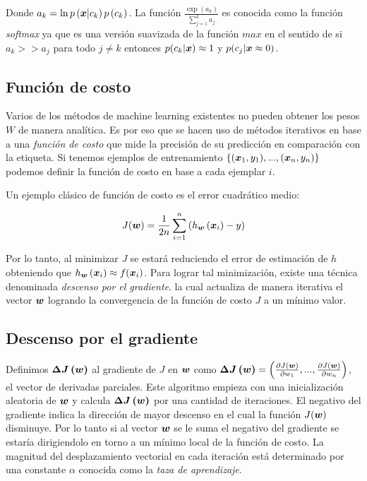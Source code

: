 Donde $a_k = \ln p\left( \boldsymbol{x} | c_k \right) p\left( c_k \right)$. La función
$\frac{\exp\left( a_k \right)}{\sum_{j=1}^{k} a_j}$ es conocida como la función
\emph{softmax} ya que es una versión suavizada de la función $max$ en el sentido de
si $a_k >> a_j$ para todo $j \neq k$ entonces $p(c_k | \boldsymbol{x}) \approx 1$ y
$p(c_j | \boldsymbol{x} \approx 0)$.

\subsection{Función de costo}

Varios de los métodos de machine learning existentes no pueden obtener los pesos
$W$ de manera analítica. Es por eso que se hacen uso de métodos iterativos en
base a una \emph{función de costo} que mide la precisión de su predicción en
comparación con la etiqueta. Si tenemos ejemplos de entrenamiento
$\{(\boldsymbol{x}_{1}, y_{1}), ..., (\boldsymbol{x}_{n}, y_{n})\}$ podemos definir la
función de costo en base a cada ejemplar $i$.

Un ejemplo clásico de función de costo es el error cuadrático medio:

\begin{align}
    J(\boldsymbol{w}) = \frac{1}{2n} \sum_{i=1}^{n}\left( h_{\boldsymbol{w}}\left( \boldsymbol{x}_{i}\right) - y \right)
\end{align}

Por lo tanto, al minimizar $J$ se estará reduciendo el error de estimación de $h$
obteniendo que $h_{\boldsymbol{w}}\left( \boldsymbol{x}_{i} \right) \approx f(\boldsymbol{x}_{i})$. Para
lograr tal minimización, existe una técnica denominada \emph{descenso por el
gradiente}. la cual actualiza de manera iterativa el vector $\boldsymbol{w}$ logrando
la convergencia de la función de costo $J$ a un mínimo valor.

\subsection{Descenso por el gradiente}

Definimos $\boldsymbol{\Delta J\left( w \right)}$ al gradiente de $J$ en $\boldsymbol{w}$
como $\boldsymbol{\Delta J\left( \boldsymbol{w} \right)} = \left(\frac{\partial
J(\boldsymbol{w})}{\partial w_1}, ..., \frac{\partial J(\boldsymbol{w})}{\partial w_n}
\right)$, el vector de derivadas parciales. Este algoritmo empieza con una
inicialización aleatoria de $\boldsymbol{w}$ y calcula
$\boldsymbol{\Delta J\left( w \right)}$ por una cantidad de iteraciones. El negativo del gradiente indica la dirección de mayor descenso en el cual la función $J(\boldsymbol{w})$ disminuye. Por lo tanto si
al vector $\boldsymbol{w}$ se le suma el negativo del gradiente se estaría
dirigiendolo en torno a un mínimo local de la función de costo. La magnitud del
desplazamiento vectorial en cada iteración está determinado por una constante
$\alpha$ conocida como la \emph{taza de aprendizaje}.

